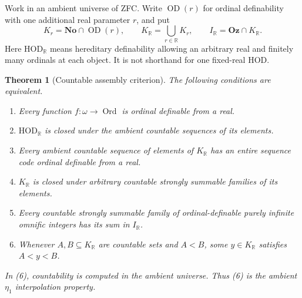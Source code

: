 \documentclass[11pt,a4paper]{article}
\numberwithin{equation}{section}
\newtheorem{theorem}{Theorem}[section]
\theoremstyle{definition}
\theoremstyle{remark}
\newcommand{\No}{\mathbf{No}}
\newcommand{\Oz}{\mathbf{Oz}}
\newcommand{\HOD}{\mathrm{HOD}}
\newcommand{\R}{\mathbb R}
\newcommand{\HR}{\HOD_{\R}}
\newcommand{\KR}{K_{\R}}
\newcommand{\IR}{I_{\R}}
\begin{document}
Work in an ambient universe of ZFC.  Write $\operatorname{OD}(r)$ for
ordinal definability with one additional real parameter $r$, and put
\[
 K_r=\No\cap\operatorname{OD}(r),\qquad
 \KR=\bigcup_{r\in\mathbb R}K_r,
 \qquad
 \IR=\Oz\cap\KR.
\]
Here $\HR$ means hereditary definability
allowing an arbitrary real and finitely many ordinals at each object.
It is not shorthand for one fixed-real HOD.

\begin{theorem}[Countable assembly criterion]\label{dsn:rp:thm:countable}
The following conditions are equivalent.
\begin{enumerate}
\item Every function $f:\omega\longrightarrow\operatorname{Ord}$ is
ordinal definable from a real.
\item $\HR$ is closed under the ambient
countable sequences of its elements.
\item Every ambient countable sequence of elements of
$\KR$ has an entire sequence code ordinal definable
from a real.
\item $\KR$ is closed under arbitrary countable
strongly summable families of its elements.
\item Every countable strongly summable family of ordinal-definable
purely infinite omnific integers has its sum in
$\IR$.
\item Whenever $A,B\subseteq\KR$ are countable
sets and $A<B$, some $y\in\KR$ satisfies $A<y<B$.
\end{enumerate}
In (6), countability is computed in the ambient universe.  Thus (6)
is the ambient $\eta_1$ interpolation property.
\end{theorem}
\end{document}
